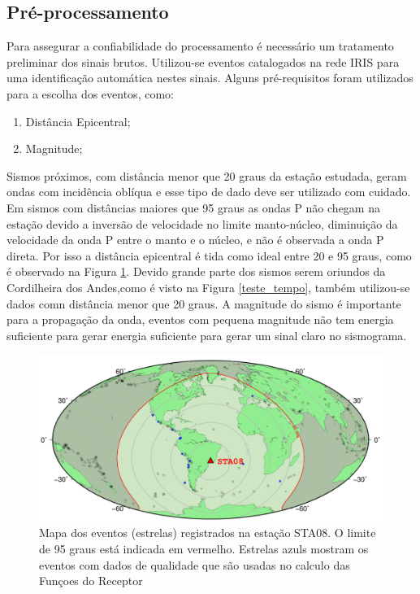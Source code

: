 \subsection*{Pré-processamento}

Para assegurar a confiabilidade do processamento é necessário um tratamento preliminar dos sinais brutos. Utilizou-se eventos catalogados na rede IRIS para uma identificação automática nestes sinais. Alguns pré-requisitos foram utilizados para a escolha dos eventos, como:

\begin{enumerate}
\item Distância Epicentral;
\item Magnitude;
\end{enumerate}

Sismos próximos, com distância menor que 20 graus da estação estudada, geram ondas com incidência oblíqua e esse tipo de dado deve ser utilizado com cuidado. Em sismos com distâncias maiores que 95 graus as ondas P não chegam na estação devido a inversão de velocidade no limite manto-núcleo, diminuição da velocidade da onda P entre o manto e o núcleo, e não é observada a onda P direta. Por isso a distância epicentral é tida como ideal entre 20 e 95 graus, como é observado na Figura \ref{mapa_eventos}. Devido grande parte dos sismos serem oriundos da Cordilheira dos Andes,como é visto na Figura \ref{teste_tempo}, também utilizou-se dados comn distância menor que 20 graus. A magnitude do sismo é importante para a propagação da onda, eventos com pequena magnitude não tem energia suficiente para gerar energia suficiente para gerar um sinal claro no sismograma.

\begin{figure}[!ht]
\centering
\includegraphics[scale=0.6]{mapa_de_eventos.png}
\caption{Mapa dos eventos (estrelas) registrados na estação STA08. O limite de 95 graus está indicada em vermelho. Estrelas azuls mostram os eventos com dados de qualidade que são usadas no calculo das Funçoes do Receptor}
\label{mapa_eventos}
\end{figure}


